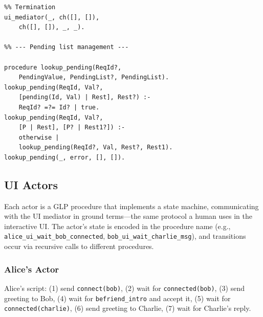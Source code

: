 \begin{verbatim}
%% Termination
ui_mediator(_, ch([], []),
    ch([], []), _, _).

%% --- Pending list management ---

procedure lookup_pending(ReqId?,
    PendingValue, PendingList?, PendingList).
lookup_pending(ReqId, Val?,
    [pending(Id, Val) | Rest], Rest?) :-
    ReqId? =?= Id? | true.
lookup_pending(ReqId, Val?,
    [P | Rest], [P? | Rest1?]) :-
    otherwise |
    lookup_pending(ReqId?, Val, Rest?, Rest1).
lookup_pending(_, error, [], []).
\end{verbatim}

\subsection{UI Actors}
\label{app:actors}

Each actor is a GLP procedure that implements a state machine, communicating with the UI mediator in ground terms---the same protocol a human uses in the interactive UI. The actor's state is encoded in the procedure name (e.g., \verb|alice_ui_wait_bob_connected|, \verb|bob_ui_wait_charlie_msg|), and transitions occur via recursive calls to different procedures.

\subsubsection{Alice's Actor}

Alice's script: (1) send \verb|connect(bob)|, (2) wait for \verb|connected(bob)|, (3) send greeting to Bob, (4) wait for \verb|befriend_intro| and accept it, (5) wait for \verb|connected(charlie)|, (6) send greeting to Charlie, (7) wait for Charlie's reply.

